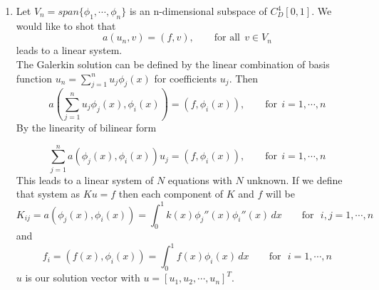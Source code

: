 {\begin{solution}
\begin{enumerate}
\begin{itemize}
      \item \textbf{Linearity} follows from the
            linearity of differentiation and integration:
            \begin{eqnarray*}
              a(\alpha u + \beta v, w)
               &=& \int_0^1 k(x) (\alpha u + \beta v)''(x) w''(x) \,dx \\[0.5em]
               &=& \int_0^1 k(x) (\alpha u''(x) + \beta v''(x)) w''(x) \,dx \\[0.5em]
               &=& \int_0^1 \alpha k(x) u''(x)  w''(x) + \beta k(x)  v''(x) w''(x) \,dx \\[0.5em]
                &=& \alpha \int_0^1 k(x) u''(x)  w''(x) + \beta \int_0^1 k(x)  v''(x) w''(x) \,dx \\[0.5em]
               &=& \alpha @ a(u,w) + \beta @ a(v,w).
               \end{eqnarray*}
      \item \textbf{Positivity} requires that $a(u,u) \ge 0$ and $a(u,u) = 0$ only when $u=0$.
            Note that
               \begin{eqnarray*}
               a(u,u) &=& \int_0^1 k(x) u''(x) u''(x)  \,dx \\[0.5em]
                      &=& \int_0^1  k(x) \Big(u''(x)\Big)^2 \,dx.
               \end{eqnarray*}
            Since $k(x)$ is  positive for all $x\in[0,1]$, 
            integrand is non-negative, and hence $a(u,u)\ge 0$.
            To have $a(u,u)=0$,we must have  $u''(x) = 0$ for all $x\in[0,1]$, which is only possible
            if $u(x)= bx+c$ by BC $b=c=0$ then $u(x)=0$ for all $x\in[0,1]$, i.e., $u=0$.
      \end{itemize}
      
     
 \item   Let $V_n = span\{\phi_1, \cdots, \phi_n\}$ is an n-dimensional subspace of $C_D^4[0, 1].$ We would like to shot that 
\[
a(u_n, v) = (f, v), \qquad \mbox{for all}\:\: v \in V_n
\]
 leads to a linear system.\\
 

The Galerkin solution can be defined by the linear combination of basis function $u_n = \sum_{j=1}^n u_j \phi_j(x)$ for coefficients  $u_j$. Then 
\[
a(\sum_{j=1}^n u_j \phi_j(x), \phi_i(x)) = (f, \phi_i(x)), \qquad \mbox{for}\:\: i=1, \cdots , n 
\]  
By the linearity of bilinear form 

\[
\sum_{j=1}^n a(\phi_j(x), \phi_i(x))  u_j  = (f, \phi_i(x)), \qquad \mbox{for}\:\: i=1, \cdots , n 
\] 
This leads to a linear system of $N$ equations with $N$ unknown. If we define that system as $Ku=f$ then each component of $K$ and $f$ will be
\[
K_{ij}=  a(\phi_j(x), \phi_i(x))= \int_0^1 k(x) \phi_j''(x) \phi_i''(x) \, dx \qquad \mbox{for} \:\:\:i,j=1, \cdots , n 
\]
and 
\[
f_{i}= (f(x), \phi_i(x))= \int_0^1 f(x) \phi_i(x) \, dx \qquad \mbox{for} \:\:\:i=1, \cdots , n 
\]
$u$ is our solution vector with $u= [u_1, u_2, \cdots, u_n]^T$.


\end{enumerate}
\end{solution}}
